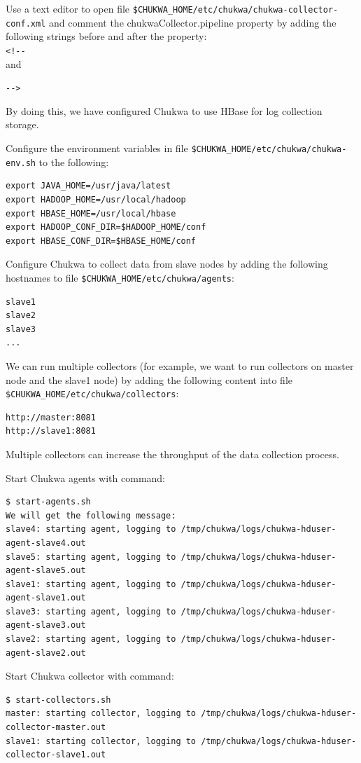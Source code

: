 Use a text editor to open file \verb|$CHUKWA_HOME/etc/chukwa/chukwa-collector-conf.xml| and comment the chukwaCollector.pipeline property by adding the following strings before and after the property: \\
\verb|<!--|\\

and

\verb|-->|

By doing this, we have configured Chukwa to use HBase for log collection storage.

Configure the environment variables in file \verb|$CHUKWA_HOME/etc/chukwa/chukwa-env.sh| to the following: 
\begin{verbatim}
export JAVA_HOME=/usr/java/latest
export HADOOP_HOME=/usr/local/hadoop
export HBASE_HOME=/usr/local/hbase
export HADOOP_CONF_DIR=$HADOOP_HOME/conf
export HBASE_CONF_DIR=$HBASE_HOME/conf
\end{verbatim}

Configure Chukwa to collect data from slave nodes by adding the following hostnames to file \verb|$CHUKWA_HOME/etc/chukwa/agents|: 
\begin{verbatim}
slave1
slave2
slave3
...
\end{verbatim}

We can run multiple collectors (for example, we want to run collectors on master node and the slave1 node) by adding the following content into file \verb|$CHUKWA_HOME/etc/chukwa/collectors|: 
\begin{verbatim}
http://master:8081
http://slave1:8081
\end{verbatim}

Multiple collectors can increase the throughput of the data collection process.

Start Chukwa agents with command: 
\begin{verbatim}
$ start-agents.sh
We will get the following message:
slave4: starting agent, logging to /tmp/chukwa/logs/chukwa-hduser-agent-slave4.out
slave5: starting agent, logging to /tmp/chukwa/logs/chukwa-hduser-agent-slave5.out
slave1: starting agent, logging to /tmp/chukwa/logs/chukwa-hduser-agent-slave1.out
slave3: starting agent, logging to /tmp/chukwa/logs/chukwa-hduser-agent-slave3.out
slave2: starting agent, logging to /tmp/chukwa/logs/chukwa-hduser-agent-slave2.out
\end{verbatim}

Start Chukwa collector with command: 
\begin{verbatim}
$ start-collectors.sh
master: starting collector, logging to /tmp/chukwa/logs/chukwa-hduser-collector-master.out
slave1: starting collector, logging to /tmp/chukwa/logs/chukwa-hduser-collector-slave1.out
\end{verbatim}

